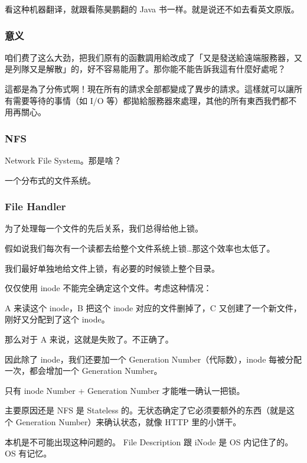 \documentclass[
]{article}
\begin{document}
看这种机器翻译，就跟看陈昊鹏翻的 Java 书一样。就是说还不如去看英文原版。

\hypertarget{header-n39}{%
\subsubsection{意义}\label{header-n39}}

咱们费了这么大劲，把我们原有的函數調用給改成了「又是發送給遠端服務器，又是列隊又是解散」的，好不容易能用了。那你能不能告訴我這有什麼好處呢？

這都是為了分佈式啊！現在所有的請求全部都變成了異步的請求。這樣就可以讓所有需要等待的事情（如
I/O 等）都拋給服務器來處理，其他的所有東西我們都不用再關心。

\hypertarget{header-n42}{%
\subsubsection{NFS}\label{header-n42}}

Network File System。那是啥？

一个分布式的文件系统。

\hypertarget{header-n45}{%
\subsubsection{File Handler}\label{header-n45}}

为了处理每一个文件的先后关系，我们总得给他上锁。

假如说我们每次有一个读都去给整个文件系统上锁\ldots 那这个效率也太低了。

我们最好单独地给文件上锁，有必要的时候锁上整个目录。

仅仅使用 inode 不能完全确定这个文件。考虑这种情况：

A 来读这个 inode，B 把这个 inode 对应的文件删掉了，C
又创建了一个新文件，刚好又分配到了这个 inode。

那么对于 A 来说，这就是失败了。不正确了。

因此除了 inode，我们还要加一个 Generation Number（代际数），inode
每被分配一次，都会增加一个 Generation Number。

只有 inode Number + Generation Number 才能唯一确认一把锁。

主要原因还是 NFS 是 Stateless
的。无状态确定了它必须要额外的东西（就是这个 Generation
Number）来确认状态，就像 HTTP 里的小饼干。

本机是不可能出现这种问题的。 File Description 跟 iNode 是 OS
内记住了的。OS 有记忆。
\end{document}
